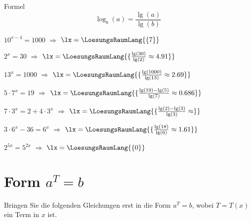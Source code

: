 Formel
$$\log_b(a) = \frac{\lg(a)}{\lg(b)}$$

\begin{bbwAufgabenBlock}
\item $10^{x-4}=1000$ $\Longrightarrow$ $\lx=\LoesungsRaumLang{\{7\}}$ 
\item $2^x=30$ $\Longrightarrow$ $\lx=\LoesungsRaumLang{\{\frac{\lg(30)}{\lg(2)}\approx 4.91\}}$ \noTRAINER{\seitenUmbruchImAufgabenteil{}}
\item $13^x=1000$ $\Longrightarrow$ $\lx=\LoesungsRaumLang{\{\frac{\lg(1000)}{\lg(13)}\approx 2.69\}}$ 
\item $5\cdot{}7^x = 19$ $\Longrightarrow$ $\lx=\LoesungsRaumLang{\{\frac{\lg(19)-\lg(5)}{\lg(7)}\approx 0.686\}}$ \noTRAINER{\seitenUmbruchImAufgabenteil{}}
\item $7\cdot{}3^x = 2 + 4\cdot{}3^x$ $\Longrightarrow$ $\lx=\LoesungsRaumLang{\{\frac{\lg(2)-\lg(3)}{\lg(3)}\approx  \}}$ 
\item $3\cdot{}6^x - 36 = 6^x$ $\Longrightarrow$ $\lx=\LoesungsRaumLang{\{\frac{\lg(18)}{\lg(6)} \approx  1.61 \}}$ \noTRAINER{\seitenUmbruchImAufgabenteil{}}
\item $2^{5x} = 5^{2x}$ $\Longrightarrow$ $\lx=\LoesungsRaumLang{\{0\}}$ 
\end{bbwAufgabenBlock}

\newpage

\section{Form $a^{T} = b$}
Bringen Sie die folgenden Gleichungen erst in die Form $a^T=b$, wobei
$T=T(x)$ ein Term in $x$ ist.

